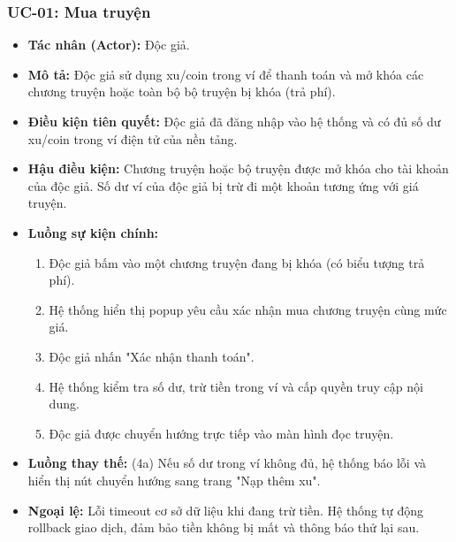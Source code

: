\subsubsection{UC-01: Mua truyện}
\begin{itemize}
    \item \textbf{Tác nhân (Actor):} Độc giả.
    \item \textbf{Mô tả:} Độc giả sử dụng xu/coin trong ví để thanh toán và mở khóa các chương truyện hoặc toàn bộ bộ truyện bị khóa (trả phí).
    \item \textbf{Điều kiện tiên quyết:} Độc giả đã đăng nhập vào hệ thống và có đủ số dư xu/coin trong ví điện tử của nền tảng.
    \item \textbf{Hậu điều kiện:} Chương truyện hoặc bộ truyện được mở khóa cho tài khoản của độc giả. Số dư ví của độc giả bị trừ đi một khoản tương ứng với giá truyện.
    \item \textbf{Luồng sự kiện chính:}
    \begin{enumerate}
        \item Độc giả bấm vào một chương truyện đang bị khóa (có biểu tượng trả phí).
        \item Hệ thống hiển thị popup yêu cầu xác nhận mua chương truyện cùng mức giá.
        \item Độc giả nhấn "Xác nhận thanh toán".
        \item Hệ thống kiểm tra số dư, trừ tiền trong ví và cấp quyền truy cập nội dung.
        \item Độc giả được chuyển hướng trực tiếp vào màn hình đọc truyện.
    \end{enumerate}
    \item \textbf{Luồng thay thế:} (4a) Nếu số dư trong ví không đủ, hệ thống báo lỗi và hiển thị nút chuyển hướng sang trang "Nạp thêm xu".
    \item \textbf{Ngoại lệ:} Lỗi timeout cơ sở dữ liệu khi đang trừ tiền. Hệ thống tự động rollback giao dịch, đảm bảo tiền không bị mất và thông báo thử lại sau.
\end{itemize}


